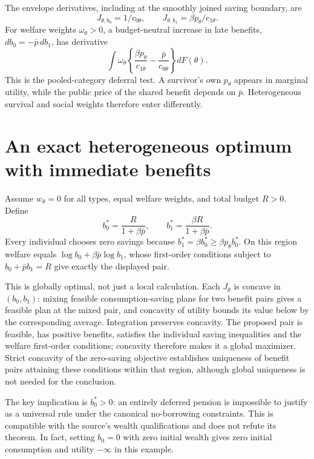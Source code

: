 \documentclass[11pt]{article}
\begin{document}
The envelope derivatives, including at the smoothly joined saving boundary, are
\[
 J_{\theta,b_0}=1/c_{0\theta},\qquad
 J_{\theta,b_1}=\beta p_\theta/c_{1\theta}.
\]
For welfare weights $\omega_\theta>0$, a budget-neutral increase in late benefits, $db_0=-\bar p\,db_1$, has derivative
\[
 \int\omega_\theta\left\{\frac{\beta p_\theta}{c_{1\theta}}
                    -\frac{\bar p}{c_{0\theta}}\right\}dF(\theta).
\]
This is the pooled-category deferral test. A survivor's own $p_\theta$ appears in marginal utility, while the public price of the shared benefit depends on $\bar p$. Heterogeneous survival and social weights therefore enter differently.

\section{An exact heterogeneous optimum with immediate benefits}
Assume $w_\theta=0$ for all types, equal welfare weights, and total budget $R>0$. Define
\[
 b_0^*=\frac{R}{1+\beta\bar p},\qquad
 b_1^*=\frac{\beta R}{1+\beta\bar p}.
\]
Every individual chooses zero savings because $b_1^*=\beta b_0^*\geq\beta p_\theta b_0^*$. On this region welfare equals
$\log b_0+\beta\bar p\log b_1$, whose first-order conditions subject to $b_0+\bar p b_1=R$ give exactly the displayed pair.

This is globally optimal, not just a local calculation. Each $J_\theta$ is concave in $(b_0,b_1)$: mixing feasible consumption-saving plans for two benefit pairs gives a feasible plan at the mixed pair, and concavity of utility bounds its value below by the corresponding average. Integration preserves concavity. The proposed pair is feasible, has positive benefits, satisfies the individual saving inequalities and the welfare first-order conditions; concavity therefore makes it a global maximizer. Strict concavity of the zero-saving objective establishes uniqueness of benefit pairs attaining these conditions within that region, although global uniqueness is not needed for the conclusion.

The key implication is $b_0^*>0$: an entirely deferred pension is impossible to justify as a universal rule under the canonical no-borrowing constraints. This is compatible with the source's wealth qualifications and does not refute its theorem. In fact, setting $b_0=0$ with zero initial wealth gives zero initial consumption and utility $-\infty$ in this example.
\end{document}
